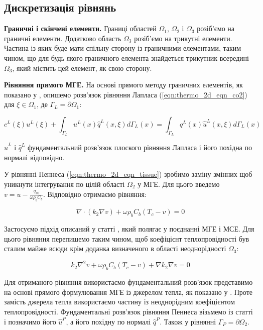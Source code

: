 \subsection{Дискретизація рівнянь}

\textbf{Граничні і скінчені елементи.} Границі областей $\Omega_1$, $\Omega_2$ і $\Omega_3$ розіб'ємо на граничні 
елементи. Додатково область $\Omega_3$ розіб'ємо на трикутні елементи. Частина із яких буде мати спільну сторону із 
граничними елементами, таким чином, що для будь якого граничного елемента знайдеться трикутник всередині $\Omega_3$, 
який містить цей елемент, як свою сторону.

\textbf{Рівняння прямого МГЕ.} На основі прямого методу граничних елементів, як показано у \cite{brebbia-bem}, опишемо 
розв'язок рівняння Лапласа (\ref{eqn:thermo_2d_eqn_co2}) для $\xi \in \Omega_1$, де $\Gamma_L = \partial\Omega_1$:

\begin{equation}
    \label{eqn:thermo_2d_bem_direct_laplace}
    c^L(\xi)u^L(\xi) + \int_{\Gamma_L}u^L(x)\hat{q}^L(x,\xi)d\Gamma_L(x) = 
        \int_{\Gamma_L}q^L(x)\hat{u}^L(x,\xi)d\Gamma_L(x)
\end{equation}

\noindent$\hat{u}^L$ і $\hat{q}^L$ фундаментальний розв'язок плоского рівняння Лапласа і його похідна по нормалі 
відповідно.

У рівнянні Пеннеса (\ref{eqn:thermo_2d_eqn_tissue}) зробимо заміну змінних щоб уникнути інтегрування по цілій області 
$\Omega_2$ у МГЕ. Для цього введемо $v = u - \frac{q_m}{\omega \rho_b C_b}$. Відповідно отримаємо рівняння:

\begin{equation*}
    \nabla \cdot (k_2\nabla{v}) + \omega \rho_b C_b (T_c - v) = 0
\end{equation*}

Застосуємо підхід описаний у статті \cite{personal-bem-thermo}, який полягає у поєднанні МГЕ і МСЕ. Для цього рівняння
перепишемо таким чином, щоб коефіцієнт теплопровідності був сталим майже всюди крім доданка визначеного в 
області неоднорідності $\Omega_3$:  

\begin{equation*}
    k_2\nabla^2{v} + \omega \rho_b C_b (T_c - v) + \nabla{k_2}\nabla{v} = 0
\end{equation*}

Для отриманого рівняння використаємо фундаментальний розв'язок представимо на основі прямого формулювання МГЕ із 
джерелом тепла, як показано у \cite{brebbia-bem}. Проте замість джерела тепла використаємо частину із неоднорідним 
коефіцієнтом теплопровідності. Фундаментальні розв'язок рівняння Пеннеса візьмемо із статті 
\cite{pennes-equation-bem-fundamental-solutions} і позначимо його $\hat{u}^P$, а його похідну по нормалі $\hat{q}^P$. 
Також у рівнянні $\Gamma_P = \partial \Omega_2$.


